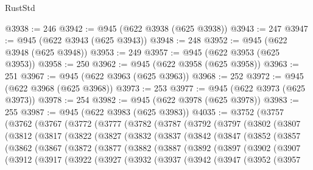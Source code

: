 \begin{lexlean}{RustStd}
\begin{coremodule}
@3938 := 246
@3942 := @945 (@622 @3938 (@625 @3938))
@3943 := 247
@3947 := @945 (@622 @3943 (@625 @3943))
@3948 := 248
@3952 := @945 (@622 @3948 (@625 @3948))
@3953 := 249
@3957 := @945 (@622 @3953 (@625 @3953))
@3958 := 250
@3962 := @945 (@622 @3958 (@625 @3958))
@3963 := 251
@3967 := @945 (@622 @3963 (@625 @3963))
@3968 := 252
@3972 := @945 (@622 @3968 (@625 @3968))
@3973 := 253
@3977 := @945 (@622 @3973 (@625 @3973))
@3978 := 254
@3982 := @945 (@622 @3978 (@625 @3978))
@3983 := 255
@3987 := @945 (@622 @3983 (@625 @3983))
@4035 := @3752
    (@3757
      (@3762
        (@3767
          (@3772
            (@3777
              (@3782
                (@3787
                  (@3792
                    (@3797
                      (@3802
                        (@3807
                          (@3812
                            (@3817
                              (@3822
                                (@3827
                                  (@3832
                                    (@3837
                                      (@3842
                                        (@3847
                                          (@3852
                                            (@3857
                                              (@3862
                                                (@3867
                                                  (@3872
                                                    (@3877
                                                      (@3882
                                                        (@3887
                                                          (@3892
                                                            (@3897
                                                              (@3902
                                                                (@3907
                                                                  (@3912
                                                                    (@3917
                                                                      (@3922
                                                                        (@3927
                                                                          (@3932
                                                                            (@3937
                                                                              (@3942
                                                                                (@3947
                                                                                  (@3952
                                                                                    (@3957

\end{coremodule}
\end{lexlean}
